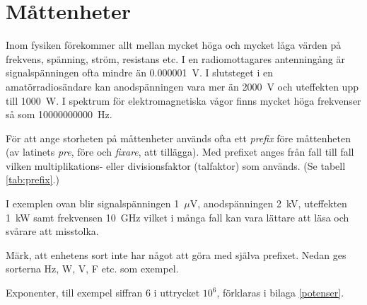 \chapter{Måttenheter}

  Inom fysiken förekommer allt mellan mycket höga och mycket låga
  värden på frekvens, spänning, ström, resistans etc.
  I en radiomottagares antenningång är signalspänningen ofta mindre än
  \SI{0,000001}{\volt}.
  I slutsteget i en amatörradiosändare kan anodspänningen vara mer än
  \SI{2000}{\volt} och uteffekten upp till \SI{1000}{\watt}.
  I spektrum för elektromagnetiska vågor finns mycket höga frekvenser
  så som \SI{10000000000}{\hertz}.

  För att ange storheten på måttenheter används ofta ett \emph{prefix} före
  måttenheten (av latinets \emph{pre}, före och \emph{fixare}, att tillägga).
  Med prefixet anges från fall till fall vilken multiplikations- eller
  divisionsfaktor (talfaktor) som används. (Se tabell \ref{tab:prefix}.)

  I exemplen ovan blir signalspänningen 1~\(\mu\)V, anodspänningen 2~kV,
  uteffekten 1~kW samt frekvensen 10~GHz vilket i många fall kan vara lättare
  att läsa och svårare att misstolka.

  Märk, att enhetens sort inte har något att göra med själva prefixet.
  Nedan ges sorterna Hz, W, V, F etc. som exempel.

  Exponenter, till exempel siffran 6 i uttrycket \(10^6\), förklaras i
  bilaga \ref{potenser}.

